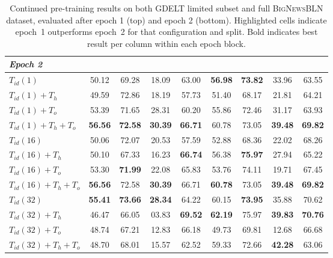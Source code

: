\begin{table}
\begin{tabular}{@{}lcccccccc@{}}
\midrule
\multicolumn{9}{l}{\textit{Epoch 2}} \\
\midrule
$T_{id}(1)$          & 50.12 & 69.28 & 18.09 & 63.00 & \textbf{56.98} & \textbf{73.82} & 33.96 & 63.55 \\
$T_{id}(1) + T_h$    & 49.59 & 72.86 & 18.19 & 57.73 & 51.40 & 68.17 & 21.81 & 64.21 \\
$T_{id}(1) + T_o$    & 53.39 & 71.65 & 28.31 & 60.20 & 55.86 & 72.46 & 31.17 & 63.93 \\
$T_{id}(1) + T_h + T_o$ & \textbf{56.56} & \textbf{72.58} & \textbf{30.39} & \textbf{66.71} & 60.78 & 73.05 & \textbf{39.48} & \textbf{69.82} \\
\midrule
$T_{id}(16)$         & 50.06 & 72.07 & 20.53 & 57.59 & 52.88 & 68.36 & 22.02 & 68.26 \\
$T_{id}(16) + T_h$   & 50.10 & 67.33 & 16.23 & \textbf{66.74} & 56.38 & \textbf{75.97} & 27.94 & 65.22 \\
$T_{id}(16) + T_o$   & 53.30 & \textbf{71.99} & 22.08 & 65.83 & 53.76 & 74.11 & 19.71 & 67.45 \\
$T_{id}(16) + T_h + T_o$ & \textbf{56.56} & 72.58 & \textbf{30.39} & 66.71 & \textbf{60.78} & 73.05 & \textbf{39.48} & \textbf{69.82} \\
\midrule
$T_{id}(32)$         & \textbf{55.41} & \textbf{73.66} & \textbf{28.34} & 64.22 & 60.15 & \textbf{73.95} & 35.88 & 70.62 \\
$T_{id}(32) + T_h$   & 46.47 & 66.05 & 03.83 & \textbf{69.52} & \textbf{62.19} & 75.97 & \textbf{39.83} & \textbf{70.76} \\
$T_{id}(32) + T_o$   & 48.74 & 67.21 & 12.83 & 66.18 & 49.73 & 69.81 & 12.68 & 66.68 \\
$T_{id}(32) + T_h + T_o$ & 48.70 & 68.01 & 15.57 & 62.52 & 59.33 & 72.66 & \textbf{42.28} & 63.06 \\
\bottomrule
\end{tabular}
\caption{Continued pre-training results on both GDELT limited subset and full \textsc{BigNewsBLN} dataset, evaluated after epoch 1 (top) and epoch 2 (bottom). \colorbox{blue!15}{Highlighted} cells indicate epoch~1 outperforms epoch~2 for that configuration and split. Bold indicates best result per column within each epoch block.}
\label{tab:pretraining-combined-full}
\end{table}
